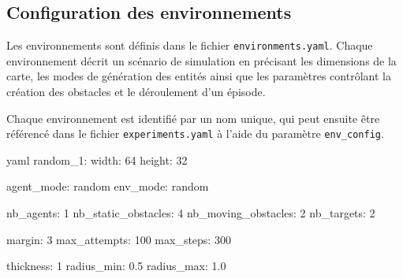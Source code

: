 \subsection{Configuration des environnements}

\noindent Les environnements sont définis dans le fichier \texttt{environments.yaml}. Chaque environnement décrit un scénario de simulation en précisant les dimensions de la carte, les modes de génération des entités ainsi que les paramètres contrôlant la création des obstacles et le déroulement d'un épisode.

\vspace{10pt}

\noindent Chaque environnement est identifié par un nom unique, qui peut ensuite être référencé dans le fichier \texttt{experiments.yaml} à l'aide du paramètre \texttt{env\_config}.

\begin{codebox}{yaml}
random_1:
  width: 64
  height: 32

  agent_mode: random
  env_mode: random

  nb_agents: 1
  nb_static_obstacles: 4
  nb_moving_obstacles: 2
  nb_targets: 2

  margin: 3
  max_attempts: 100
  max_steps: 300

  thickness: 1
  radius_min: 0.5
  radius_max: 1.0
\end{codebox}

